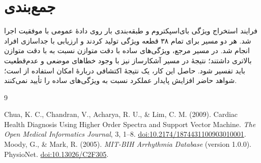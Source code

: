 \documentclass[11pt,a4paper]{article}
\newcommand{\fnum}[1]{\lr{\persianfont #1}}
\begin{document}
\section{جمع‌بندی}
فرایند استخراج ویژگی بای‌اسپکتروم و طبقه‌بندی بار  روی دادهٔ عمومی با موفقیت اجرا شد. هر دو مسیر برای تمام ۳۸ قطعه ویژگی تولید کردند و ارزیابی با جداسازی افراد انجام شد. در مسیر مرجع، ویژگی‌های ساده با دقت متوازن \fnum{۹۵٫۸۳٪} نسبت به  با \fnum{۸۹٫۷۴٪} دقت متوازن بالاتری داشتند؛ نتیجهٔ \fnum{۹۶٫۱۵٪} در مسیر آشکارساز نیز با وجود خطاهای موضعی و عدم‌قطعیت باید تفسیر شود. حاصل این کار، یک نتیجهٔ اکتشافی دربارهٔ امکان استفاده از  است؛ شواهد حاضر افزایش پایدار عملکرد نسبت به ویژگی‌های ساده را تأیید نمی‌کنند.
\begingroup\footnotesize
\begin{thebibliography}{9}
\begin{latin}
 Chua, K. C., Chandran, V., Acharya, R. U., \& Lim, C. M. (2009).
Cardiac Health Diagnosis Using Higher Order Spectra and Support Vector Machine.
\textit{The Open Medical Informatics Journal}, 3, 1--8.
\href{https://doi.org/10.2174/1874431100903010001}{doi:10.2174/1874431100903010001}.
 Moody, G., \& Mark, R. (2005).
\textit{MIT-BIH Arrhythmia Database} (version 1.0.0). PhysioNet.
\href{https://doi.org/10.13026/C2F305}{doi:10.13026/C2F305}.
\end{latin}
\end{thebibliography}
\endgroup
\end{document}
